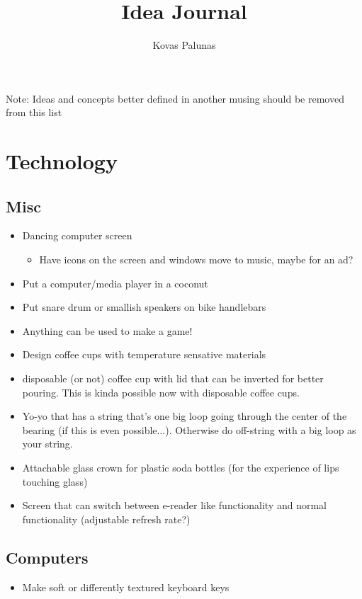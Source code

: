 \documentclass{amsart}
\title{Idea Journal}
\author{Kovas Palunas}
\begin{document}
\maketitle
Note: Ideas and concepts better defined in another musing should be removed from this list

\section{Technology}
\subsection{Misc}
\begin{itemize}
\item{Dancing computer screen}
\begin{itemize}
\item{Have icons on the screen and windows move to music, maybe for an ad?}
\end{itemize}
\item{Put a computer/media player in a coconut}
\item{Put snare drum or smallish speakers on bike handlebars}
\item{Anything can be used to make a game!}
\item{Design coffee cups with temperature sensative materials}
\item{disposable (or not) coffee cup with lid that can be inverted for better pouring.  This is kinda possible now with disposable coffee cups.}
\item{Yo-yo that has a string that's one big loop going through the center of the bearing (if this is even possible...).  Otherwise do off-string with a big loop as your string.}
\item{Attachable glass crown for plastic soda bottles (for the experience of lips touching glass)}
\item{Screen that can switch between e-reader like functionality and normal functionality (adjustable refresh rate?)}
\end{itemize}
\subsection{Computers}
\begin{itemize}
\item{Make soft or differently textured keyboard keys}
\end{itemize}
\end{document}
